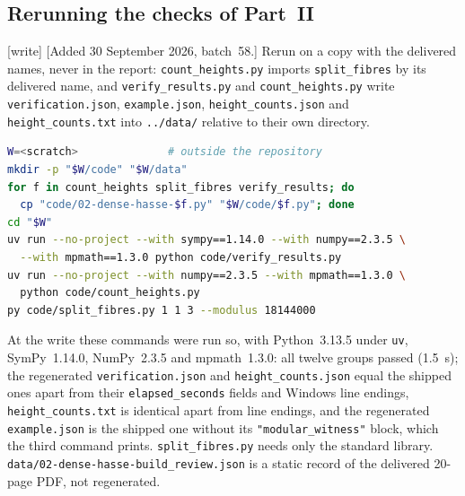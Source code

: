 \documentclass[11pt]{article}
\numberwithin{equation}{section}
\theoremstyle{plain}
\theoremstyle{plain}
\theoremstyle{plain}
\theoremstyle{definition}
\theoremstyle{definition}
\theoremstyle{definition}
\theoremstyle{remark}
\newcommand{\wtag}{\textup{[write]}}%
\newcommand{\rpath}[1]{\nolinkurl{#1}}
\begin{document}
\subsection{Rerunning the checks of Part~II}\label{alg:dh:app:rerun}
\wtag{} [Added 30 September 2026, batch~58.] Rerun on a copy with the
delivered names, never in the report: \texttt{count\_heights.py} imports
\texttt{split\_fibres} by its delivered name, and
\texttt{verify\_results.py} and \texttt{count\_heights.py} write
\texttt{verification.json}, \texttt{example.json},
\texttt{height\_counts.json} and \texttt{height\_counts.txt} into
\rpath{../data/} relative to their own directory.
\begin{lstlisting}[language=bash]
W=<scratch>              # outside the repository
mkdir -p "$W/code" "$W/data"
for f in count_heights split_fibres verify_results; do
  cp "code/02-dense-hasse-$f.py" "$W/code/$f.py"; done
cd "$W"
uv run --no-project --with sympy==1.14.0 --with numpy==2.3.5 \
  --with mpmath==1.3.0 python code/verify_results.py
uv run --no-project --with numpy==2.3.5 --with mpmath==1.3.0 \
  python code/count_heights.py
py code/split_fibres.py 1 1 3 --modulus 18144000
\end{lstlisting}
At the write these commands were run so, with Python~3.13.5 under
\texttt{uv}, SymPy~1.14.0, NumPy~2.3.5 and mpmath~1.3.0: all twelve
groups passed (1.5~s); the regenerated \texttt{verification.json} and
\texttt{height\_counts.json} equal the shipped ones apart from their
\texttt{elapsed\_seconds} fields and Windows line endings,
\texttt{height\_counts.txt} is identical apart from line endings, and
the regenerated \texttt{example.json} is the shipped one without its
\texttt{"modular\_witness"} block, which the third command prints.
\texttt{split\_fibres.py} needs only the standard library.
\rpath{data/02-dense-hasse-build_review.json} is a static record of the
delivered 20-page PDF, not regenerated.
\end{document}
